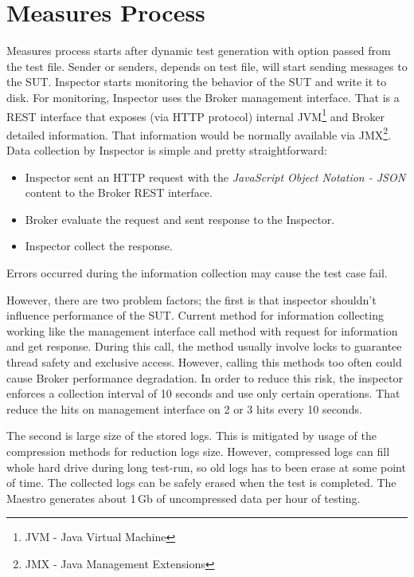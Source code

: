 \section{Measures Process}
\label{Measures Process}
Measures process starts after dynamic test generation with option passed from the test file. Sender or senders, depends on test file, will start sending messages to the SUT. Inspector starts monitoring the behavior of the SUT and write it to disk. For monitoring, Inspector uses the Broker management interface. That is a REST interface that exposes (via HTTP protocol) internal JVM\footnote{JVM - Java Virtual Machine} and Broker detailed information. That information would be normally available via JMX\footnote{JMX - Java Management Extensions}. Data collection by Inspector is simple and pretty straightforward:

\begin{itemize}
	\setlength\itemsep{0em}
	\item Inspector sent an HTTP request with the \emph{JavaScript Object Notation - JSON}\footnotemark{} content to the Broker REST interface.
	\item Broker evaluate the request and sent response to the Inspector.
	\item Inspector collect the response.
\end{itemize}
Errors occurred during the information collection may cause the test case fail.


However, there are two problem factors; the first is that inspector shouldn't influence performance of the SUT. Current method for information collecting working like the management interface call method with request for information and get response. During this call, the method usually involve locks to guarantee thread safety and exclusive access. However, calling this methods too often could cause Broker performance degradation. In order to reduce this risk, the inspector enforces a collection interval of 10 seconds and use only certain operations. That reduce the hits on management interface on 2 or 3 hits every 10 seconds.

The second is large size of the stored logs. This is mitigated by usage of the compression methods for reduction logs size. However, compressed logs can fill whole hard drive during long test-run, so old logs has to been erase at some point of time. The collected logs can be safely erased when the test is completed. The Maestro generates about 1\,Gb of uncompressed data per hour of testing.

